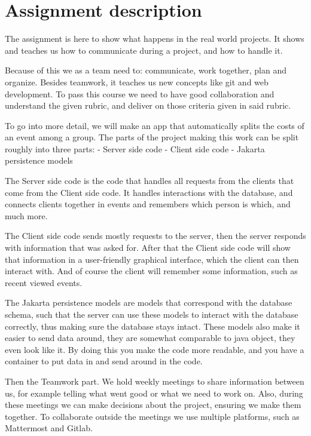 \section{Assignment description}

The assignment is here to show what happens in the real world projects.
It shows and teaches us how to communicate during a project, and how to handle it.

Because of this we as a team need to: communicate, work together, plan and organize.
Besides teamwork, it teaches us new concepts like git and web development.
To pass this course we need to have good collaboration and understand the given rubric, and deliver on those criteria given in said rubric.

To go into more detail, we will make an app that automatically splits the costs of an event among a group.
The parts of the project making this work can be split roughly into three parts:
    - Server side code
    - Client side code
    - Jakarta persistence models

The Server side code is the code that handles all requests from the clients that come from the Client side code.
It handles interactions with the database, and connects clients together in events and remembers which person is which, and much more.

The Client side code sends mostly requests to the server, then the server responds with information that was asked for.
After that the Client side code will show that information in a user-friendly graphical interface, which the client can then interact with.
And of course the client will remember some information, such as recent viewed events.

The Jakarta persistence models are models that correspond with the database schema, such that the server can use these models to interact with the database correctly, thus making sure the database stays intact.
These models also make it easier to send data around, they are somewhat comparable to java object, they even look like it.
By doing this you make the code more readable, and you have a container to put data in and send around in the code.


Then the Teamwork part.
We hold weekly meetings to share information between us, for example telling what went good or what we need to work on.
Also, during these meetings we can make decisions about the project, ensuring we make them together.
To collaborate outside the meetings we use multiple platforms, such as Mattermost and Gitlab.
